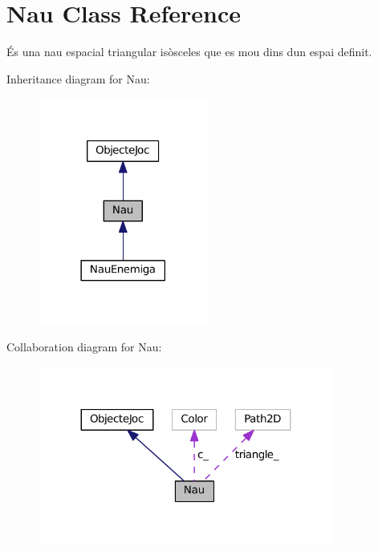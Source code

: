 \hypertarget{class_nau}{}\section{Nau Class Reference}
\label{class_nau}


És una nau espacial triangular isòsceles que es mou dins d\textquotesingle{}un espai definit.  




Inheritance diagram for Nau\+:\nopagebreak
\begin{figure}[H]
\begin{center}
\leavevmode
\includegraphics[width=158pt]{class_nau__inherit__graph}
\end{center}
\end{figure}


Collaboration diagram for Nau\+:\nopagebreak
\begin{figure}[H]
\begin{center}
\leavevmode
\includegraphics[width=275pt]{class_nau__coll__graph}
\end{center}
\end{figure}
